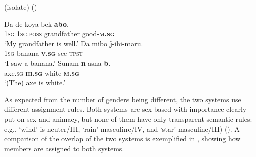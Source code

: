 \documentclass[output=collectionpaper]{langsci/langscibook}
\begin{document}
\ea
\label{ex:Svard:11}
 (isolate) (\citealt[105, 109, 100]{Donohue2001})\\
\begin{xlist}
\ex
\gll Da de koya bek-\textbf{abo}.\\
     \textsc{1sg} \textsc{1sg.poss} grandfather good-\textsc{\textbf{m.sg}}\\
\glt `My grandfather is well.'
\ex
\gll Da mibo \textbf{j}{}-ihi-maru.\\
     \textsc{1sg} banana \textsc{\textbf{v.sg}}{}-see-\textsc{tpst}\\
\glt `I saw a banana.'
\ex
\gll Sunam \textbf{n}{}-asna-\textbf{b}.\\
     axe.\textsc{sg} \textsc{\textbf{iii.sg}}\textsc{{}-}white\textsc{{}-}\textsc{\textbf{m.sg}}\\
\glt `(The) axe is white.'
\end{xlist}
\z


As expected from the number of genders being different, the two systems use different assignment rules. Both systems are sex-based with importance clearly put on sex and animacy, but none of them have only transparent semantic rules: e.g., `wind' is neuter/III, `rain' masculine/IV, and `star' masculine/III) (\citealt[103--107]{Donohue2001}). A comparison of the overlap of the two systems is exemplified in , showing how members are assigned to both systems.
\end{document}
